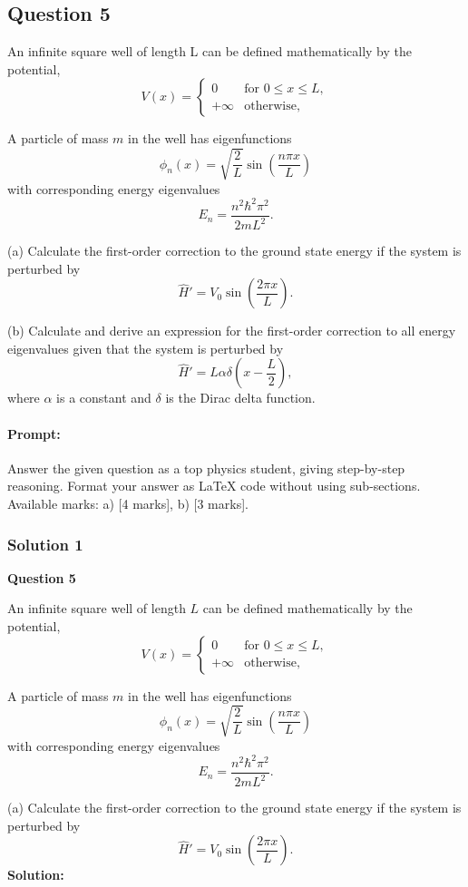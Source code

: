 \documentclass{article}
\begin{document}
\subsection{Question 5}
An infinite square well of length L can be defined mathematically by the potential,
\[
V(x) = 
\begin{cases} 
0 & \text{for } 0 \leq x \leq L, \\
+\infty & \text{otherwise},
\end{cases}
\]

A particle of mass \(m\) in the well has eigenfunctions
\[
\phi_n(x) = \sqrt{\frac{2}{L}} \sin\left(\frac{n \pi x}{L}\right)
\]
with corresponding energy eigenvalues
\[
E_n = \frac{n^2 \hbar^2 \pi^2}{2mL^2}.
\]

(a) Calculate the first-order correction to the ground state energy if the system is perturbed by
\[
\hat{H}' = V_0 \sin\left(\frac{2\pi x}{L}\right).
\]

(b) Calculate and derive an expression for the first-order correction to all energy eigenvalues given that the system is perturbed by
\[
\hat{H}' = L \alpha \delta\left(x - \frac{L}{2}\right),
\]
where \(\alpha\) is a constant and \(\delta\) is the Dirac delta function.

\paragraph{Prompt: \\} 
Answer the given question as a top physics student, giving step-by-step reasoning. Format your answer as LaTeX code without using sub-sections. Available marks: a) [4 marks], b) [3 marks].


\subsubsection{Solution 1}
\textbf{Question 5}

An infinite square well of length $L$ can be defined mathematically by the potential,
\[
V(x) = 
\begin{cases}
0 & \text{for } 0 \leq x \leq L, \\
+\infty & \text{otherwise},
\end{cases}
\]

A particle of mass $m$ in the well has eigenfunctions
\[
\phi_n(x) = \sqrt{\frac{2}{L}} \sin\left(\frac{n \pi x}{L}\right)
\]
with corresponding energy eigenvalues
\[
E_n = \frac{n^2 \hbar^2 \pi^2}{2mL^2}.
\]

(a) Calculate the first-order correction to the ground state energy if the system is perturbed by
\[
\hat{H}' = V_0 \sin\left(\frac{2\pi x}{L}\right).
\]
\textbf{Solution:}
\end{document}
